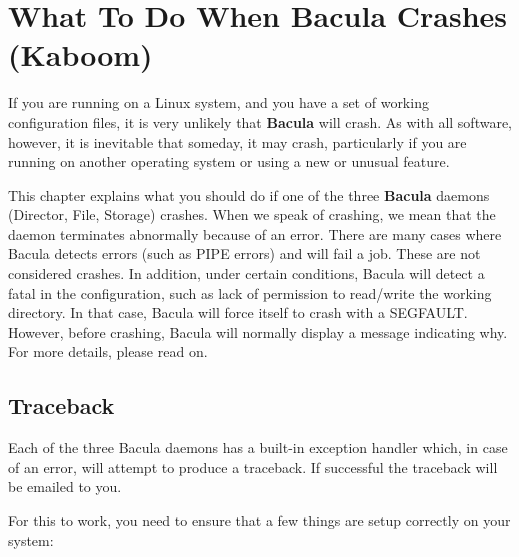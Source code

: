 
\chapter{What To Do When Bacula Crashes (Kaboom)}
\label{KaboomChapter}

If you are running on a Linux system, and you have a set of working
configuration files, it is very unlikely that {\bf Bacula} will crash. As with
all software, however, it is inevitable that someday, it may crash,
particularly if you are running on another operating system or using a new or
unusual feature.

This chapter explains what you should do if one of the three {\bf Bacula}
daemons (Director, File, Storage) crashes.  When we speak of crashing, we
mean that the daemon terminates abnormally because of an error.  There are
many cases where Bacula detects errors (such as PIPE errors) and will fail
a job. These are not considered crashes.  In addition, under certain
conditions, Bacula will detect a fatal in the configuration, such as
lack of permission to read/write the working directory. In that case,
Bacula will force itself to crash with a SEGFAULT. However, before
crashing, Bacula will normally display a message indicating why.
For more details, please read on.


\section{Traceback}

Each of the three Bacula daemons has a built-in exception handler which, in
case of an error, will attempt to produce a traceback. If successful the
traceback will be emailed to you.

For this to work, you need to ensure that a few things are setup correctly on
your system:

